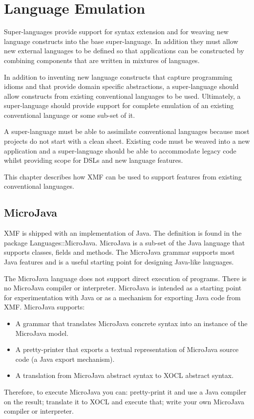 \chapter{Language Emulation}

Super-languages provide support for syntax extension and for weaving new language
constructs into the base super-language. In addition they must allow new 
external languages to be defined so that applications can be constructed
by combining components that are written in mixtures of languages.

In addition to inventing new language constructs that capture programming
idioms and that provide domain specific abstractions, a super-language
should allow constructs from existing conventional languages to be used.
Ultimately, a super-language should provide support for complete emulation
of an existing conventional language or some sub-set of it.

A super-language must be able to assimilate conventional languages because
most projects do not start with a clean sheet. Existing code must be weaved
into a new application and a super-language should be able to accommodate
legacy code whilst providing scope for DSLs and new language features.

This chapter describes how XMF can be used to support features from existing
conventional languages.

\section{MicroJava}

XMF is shipped with an implementation of Java. The definition is found in 
the package Languages::MicroJava. MicroJava is a sub-set of the Java language
that supports classes, fields and methods. The MicroJava grammar supports
most Java features and is a useful starting point for designing Java-like
languages.

The MicroJava language does not support direct execution of programs. There
is no MicroJava compiler or interpreter. MicroJava is intended as a starting 
point for experimentation with Java or as a mechanism for exporting Java
code from XMF. MicroJava supports:
\begin{itemize}
\item A grammar that translates MicroJava concrete syntax into an instance
of the MicroJava model.
\item A pretty-printer that exports a textual representation of MicroJava
source code (a Java export mechanism).
\item A translation from MicroJava abstract syntax to XOCL abstract syntax.
\end{itemize}
Therefore, to execute MicroJava you can: pretty-print it and use a Java
compiler on the result; translate it to XOCL and execute that; write your
own MicroJava compiler or interpreter.

